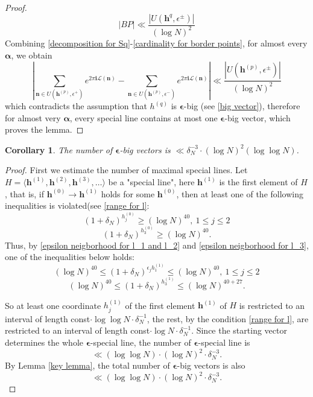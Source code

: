 \documentclass[11pt]{article}
\newtheorem{cor}{Corollary}[section]
\newcommand{\beq}{\begin{equation}}
\newcommand{\eeq}{\end{equation}}
\newcommand{\fc}{\frac}
\newcommand{\ra}{\rightarrow}
\renewcommand{\l}{\left}
\renewcommand{\r}{\right}
\newcommand{\e}{\epsilon}
\renewcommand{\i}{\mathbf{i}}
\renewcommand{\(}{\left(}
\renewcommand{\)}{\right)}
\renewcommand{\bf}{\mathbf}
\renewcommand{\d}{\delta}
\renewcommand{\L}{\mathcal{L}}
\newcommand{\Uq}{U(\bf{h}^{q},\e^{\pm})}
\newcommand{\hq}{h^{(q)}}
\newcommand{\bma}{\bm{\alpha}}
\newcommand{\<}{\langle}
\renewcommand{\>}{\rangle}
\begin{document}
\begin{proof}
\beq\label{cardinality for border points}
|BP|\ll \fc{|\Uq|}{(\log N)^2}
\eeq
Combining \eqref{decomposition for Sq}-\eqref{cardinality for border points}, for almost every $\bma$, we obtain
$$
\l|\sum_{\bf{n}\in U(\bf{h}^{(p)},\e^+)}e^{2\pi \i \L(\bf{n})}-\sum_{\bf{n}\in U(\bf{h}^{(p)},\e^-)}e^{2\pi \i \L(\bf{n})}\r| \ll \fc{|U(\bf{h}^{(p)},\e^{\pm})|}{(\log N)^2}
$$
which contradicts the assumption that $\hq$ is $\bm{\e}$-big (see \eqref{big vector}), therefore for almost very $\bma$, every special line contains at most one $\bm{\e}$-big vector, which proves the lemma.
\end{proof}

\begin{cor}\label{number of e-big vectors}
The number of $\bm{\e}$-big vectors is $\ll\d_N^{-3}\cdot(\log N)^2(\log \log N)$.
\end{cor}{}
\begin{proof}
First we estimate the number of maximal special lines. Let $H=\<\bf{h}^{(1)},\bf{h}^{(2)},\bf{h}^{(3)},\dots\>$ be a "special line", here $\bf{h}^{(1)}$ is the first element of $H$, that is, if $\bf{h}^{(0)} {\ra}\bf{h}^{(1)}$ holds for some $\bf{h}^{(0)}$, then at least one of the following inequalities is violated(see \eqref{range for l}:
$$
(1+\d_N)^{h_j^{(0)}}\ge (\log N)^{40}, \ 1\le j\le 2 $$
$$
(1+\d_N)^{h_3^{(0)}}\ge (\log N)^{40}.
$$
Thus, by \eqref{epsilon neigborhood for l_1 and l_2} and \eqref{epsilon neigborhood for l_3}, one of the inequalities below holds:
$$
(\log N)^{40}\le(1+\d_N)^{\e_j h_1^{(1)}}\le (\log N)^{40}, \ 1\le j\le 2 $$
$$
(\log N)^{40}\le(1+\d_N)^{h_3^{(1)}}\le (\log N)^{40+27}. $$

So at least one coordinate $h_j^{(1)}$ of the first element $\bf{h}^{(1)}$ of $H$ is restricted to an interval of length const$\cdot \log \log N\cdot \d_N^{-1}$, the rest, by the condition \eqref{range for l}, are restricted to an interval of length const$\cdot \log N\cdot \d_N^{-1}$. Since the starting vector determines the whole $\bm{\e}$-special line, the number of $\bm{\e}$-special line is
$$
\ll (\log \log N)\cdot (\log N)^2\cdot\d_N^{-3}.
$$
By Lemma \ref{key lemma}, the total number of $\bm{\e}$-big vectors is also
$$
\ll (\log \log N)\cdot (\log N)^2\cdot\d_N^{-3}.
$$

\end{proof}
\end{document}
